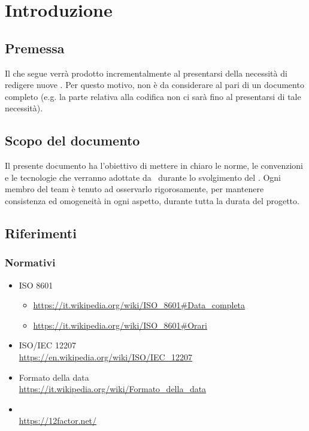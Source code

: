 \section{Introduzione}

    

    \subsection{Premessa}
    Il  che segue verrà prodotto incrementalmente al presentarsi della necessità di redigere nuove .
    Per questo motivo, non è da considerare al pari di un documento completo (e.g. la parte relativa alla codifica non ci sarà fino
    al presentarsi di tale necessità).

    \subsection{Scopo del documento}
    Il presente documento ha l’obiettivo di mettere in chiaro le norme, le convenzioni e le tecnologie che verranno adottate da \gruppo\ durante lo svolgimento del . Ogni membro del team \`e tenuto ad osservarlo rigorosamente, per mantenere consistenza ed omogeneit\`a in ogni aspetto, durante tutta la durata del progetto.\par

    


\subsection{Riferimenti}

    \subsubsection{Normativi}	\label{rifnorma}
    \begin{itemize}
        \item ISO 8601 
        \begin{itemize}
            \item \url{https://it.wikipedia.org/wiki/ISO\_8601#Data_completa}
            \item \url{https://it.wikipedia.org/wiki/ISO\_8601#Orari}
        \end{itemize}
    	\item ISO/IEC 12207 \\\url{https://en.wikipedia.org/wiki/ISO/IEC_12207}
    	\item Formato della data \\\url{https://it.wikipedia.org/wiki/Formato\_della\_data}
        \item {}\\ %
        \url{https://12factor.net/}
    \end{itemize}

